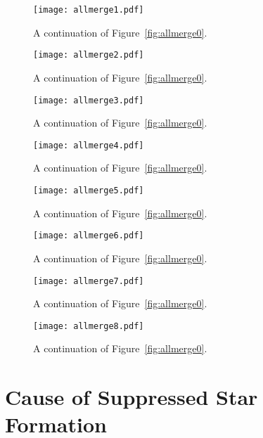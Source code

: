 \documentclass[twocolumn,linenumbers,trackchanges]{aastex631}
\begin{document}
\begin{figure*}
  \centering
  \texttt{[image: allmerge1.pdf]}
  \caption{A continuation of Figure~\ref{fig:allmerge0}.}
  \label{fig:allmerge1}
\end{figure*}

\begin{figure*}
  \centering
  \texttt{[image: allmerge2.pdf]}
  \caption{A continuation of Figure~\ref{fig:allmerge0}.}
  \label{fig:allmerge2}
\end{figure*}

\begin{figure*}
  \centering
  \texttt{[image: allmerge3.pdf]}
  \caption{A continuation of Figure~\ref{fig:allmerge0}.}
  \label{fig:allmerge3}
\end{figure*}

\begin{figure*}
  \centering
  \texttt{[image: allmerge4.pdf]}
  \caption{A continuation of Figure~\ref{fig:allmerge0}.}
  \label{fig:allmerge4}
\end{figure*}

\begin{figure*}
  \centering
  \texttt{[image: allmerge5.pdf]}
  \caption{A continuation of Figure~\ref{fig:allmerge0}.}
  \label{fig:allmerge5}
\end{figure*}

\begin{figure*}
  \centering
  \texttt{[image: allmerge6.pdf]}
  \caption{A continuation of Figure~\ref{fig:allmerge0}.}
  \label{fig:allmerge6}
\end{figure*}

\begin{figure*}
  \centering
  \texttt{[image: allmerge7.pdf]}
  \caption{A continuation of Figure~\ref{fig:allmerge0}.}
  \label{fig:allmerge7}
\end{figure*}

\begin{figure*}
  \centering
  \texttt{[image: allmerge8.pdf]}
  \caption{A continuation of Figure~\ref{fig:allmerge0}.}
  \label{fig:allmerge8}
\end{figure*}

\section{Cause of Suppressed Star Formation}\label{app:cause_qui}
\end{document}
